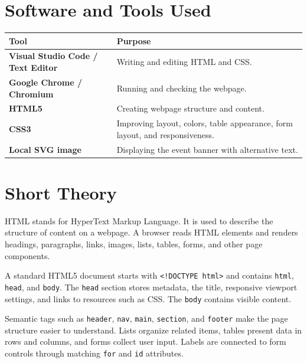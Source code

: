 \documentclass[12pt,a4paper]{article}
\begin{document}
\section{Software and Tools Used}
\begin{table}[H]
\centering
\renewcommand{\arraystretch}{1.25}
\begin{tabularx}{\textwidth}{>{\bfseries}p{3.8cm}X}
\toprule
Tool & Purpose \\
\midrule
Visual Studio Code / Text Editor & Writing and editing HTML and CSS. \\
Google Chrome / Chromium & Running and checking the webpage. \\
HTML5 & Creating webpage structure and content. \\
CSS3 & Improving layout, colors, table appearance, form layout, and responsiveness. \\
Local SVG image & Displaying the event banner with alternative text. \\
\bottomrule
\end{tabularx}
\end{table}

\section{Short Theory}
HTML stands for HyperText Markup Language. It is used to describe the structure of content on a webpage. A browser reads HTML elements and renders headings, paragraphs, links, images, lists, tables, forms, and other page components.

A standard HTML5 document starts with \texttt{<!DOCTYPE html>} and contains \texttt{html}, \texttt{head}, and \texttt{body}. The \texttt{head} section stores metadata, the title, responsive viewport settings, and links to resources such as CSS. The \texttt{body} contains visible content.

Semantic tags such as \texttt{header}, \texttt{nav}, \texttt{main}, \texttt{section}, and \texttt{footer} make the page structure easier to understand. Lists organize related items, tables present data in rows and columns, and forms collect user input. Labels are connected to form controls through matching \texttt{for} and \texttt{id} attributes.
\end{document}
